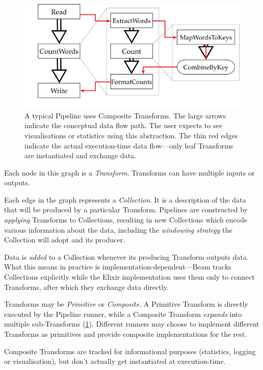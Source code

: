 \begin{figure}[t]
	\includegraphics[width=\textwidth]{images/diags/composite-example}
	\caption[An illustration of the function of Composite Transforms in a typical Pipeline.]{A typical Pipeline uses Composite Transforms. The large arrows indicate the conceptual data flow path. The user expects to see visualisations or statistics using this abstraction. The thin red edges indicate the actual execution-time data flow---only leaf Transforms are instantiated and exchange data.}
	\label{fig:impl:composite-transforms}
\end{figure}

Each node in this graph is a \emph{Transform}.
Transforms can have multiple inputs or outputs.

Each edge in the graph represents a \emph{Collection}.
It is a description of the data that will be produced by a particular Transform.
Pipelines are constructed by \emph{applying} Transforms to Collections, resulting in new Collections which encode various information about the data, including the \emph{windowing strategy} the Collection will adopt and its producer.

Data is \emph{added} to a Collection whenever its producing Transform outputs data.
What this means in practice is implementation-dependent---Beam tracks Collections explicitly while the Elixir implementation uses them only to connect Transforms, after which they exchange data directly.

Transforms may be \emph{Primitive} or \emph{Composite}.
A Primitive Transform is directly executed by the Pipeline runner, while a Composite Transform \emph{expands} into multiple sub-Transforms (\cref{fig:impl:composite-transforms}).
Different runners may choose to implement different Transforms as primitives and provide composite implementations for the rest.

Composite Transforms are tracked for informational purposes (statistics, logging or visualisation), but don't actually get instantiated at execution-time.


